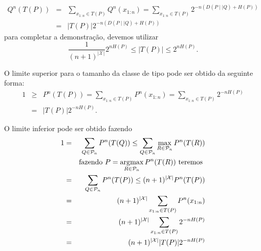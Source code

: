 \begin{questions}
\begin{solution}
\begin{parts}
   \begin{eqnarray}
   Q^n(T(P)) &=& \sum_{x_{1:n} \in T(P)} Q^n(x_{1:n}) = \sum_{x_{1:n} \in T(P)} 2^{-n (D(P \mid \mid Q) + H(P))} \nonumber \\
        &=& \vert T(P) \vert 2^{-n (D(P \mid \mid Q) + H(P))}
   \end{eqnarray}
   para completar a demonstração, devemos utilizar
        \begin{equation}
        \frac{1}{(n+1)^{\vert \mathcal{X} \vert}} 2^{nH(P)} \leq \vert T(P) \vert \leq 2^{nH(P)} .
        \end{equation}

O limite superior para o tamanho da classe de tipo pode ser obtido da seguinte forma:
  \begin{eqnarray}
  1 &\geq& P^{n} (T(P)) = \sum_{x_{1:n} \in T(P)} P^{n} (x_{1:n}) = \sum_{x_{1:n} \in T(P)} 2^{-nH(P)} \nonumber \\
    &=& \vert T(P) \vert 2^{-nH(P)} .
  \end{eqnarray}

O limite inferior pode ser obtido fazendo
  \begin{eqnarray}
  1 &=& \sum_{Q \in \mathcal{P}_n} P^n (T(Q)) \leq \sum_{Q \in \mathcal{P}_n} \max_{R \in \mathcal{P}_n} P^n (T(R)) \nonumber \\
         && \text{fazendo } P = \operatorname*{\arg\!\max}_{R \in \mathcal{P}_n} P^n (T(R)) \text{ teremos } \nonumber \\
        &=& \sum_{Q \in \mathcal{P}_n} P^n (T(P)) \leq (n+1)^{\vert \mathcal{X} \vert} P^n (T(P)) \nonumber \\
        &=& (n+1)^{\vert \mathcal{X} \vert} \sum_{x_{1:n} \in T(P)} P^n (x_{1:n}) \nonumber \\
        &=& (n+1)^{\vert \mathcal{X} \vert} \sum_{x_{1:n} \in T(P)} 2^{-nH(P)} \nonumber \\
        &=& (n+1)^{\vert \mathcal{X} \vert} \vert T(P) \vert 2^{-nH(P)} 
  \end{eqnarray}



\end{parts}
\end{solution}
\end{questions}
